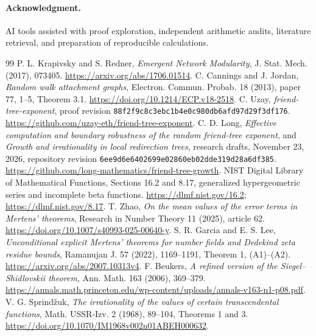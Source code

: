 \documentclass[11pt]{article}
\theoremstyle{remark}
\begin{document}
\paragraph{Acknowledgment.}
AI tools assisted with proof exploration, independent arithmetic audits,
literature retrieval, and preparation of reproducible calculations.

\begin{thebibliography}{99}
 P. L. Krapivsky and S. Redner,
\emph{Emergent Network Modularity}, J. Stat. Mech. (2017), 073405.
\url{https://arxiv.org/abs/1706.01514}.
 C. Cannings and J. Jordan,
\emph{Random walk attachment graphs}, Electron. Commun. Probab.
18 (2013), paper 77, 1--5, Theorem 3.1.
\url{https://doi.org/10.1214/ECP.v18-2518}.
 C. Uzay, \emph{friend-tree-exponent}, proof revision
\texttt{88f2f9c8c3ebc1b4e0c980db6afd97d29f3df176}.
\url{https://github.com/uzay-eth/friend-tree-exponent}.
 C. D. Long, \emph{Effective computation and boundary
robustness of the random friend-tree exponent}, and
\emph{Growth and irrationality in local redirection trees}, research
drafts, November 23, 2026, repository revision
\texttt{6ee9d6e6402699e02860eb02dde319d28a6df385}.
\url{https://github.com/long-mathematics/friend-tree-growth}.
 NIST Digital Library of Mathematical Functions,
Sections 16.2 and 8.17, generalized hypergeometric series and incomplete
beta functions.
\url{https://dlmf.nist.gov/16.2}; \url{https://dlmf.nist.gov/8.17}.
 T. Zhao, \emph{On the mean values of the error terms in
Mertens' theorems}, Research in Number Theory 11 (2025), article 62.
\url{https://doi.org/10.1007/s40993-025-00640-y}.
 S. R. Garcia and E. S. Lee,
\emph{Unconditional explicit Mertens' theorems for number fields and
Dedekind zeta residue bounds}, Ramanujan J. 57 (2022), 1169--1191,
Theorem 1, (A1)--(A2).
\url{https://arxiv.org/abs/2007.10313v4}.
 F. Beukers, \emph{A refined version of the
Siegel--Shidlovskii theorem}, Ann. Math. 163 (2006), 369--379.
\url{https://annals.math.princeton.edu/wp-content/uploads/annals-v163-n1-p08.pdf}.
 V. G. Sprind\v zuk,
\emph{The irrationality of the values of certain transcendental
functions}, Math. USSR-Izv. 2 (1968), 89--104, Theorems 1 and 3.
\url{https://doi.org/10.1070/IM1968v002n01ABEH000632}.
\end{thebibliography}
\end{document}
